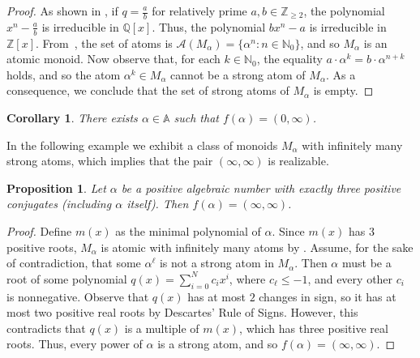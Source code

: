 \documentclass[11pt]{amsart}
\newtheorem{proposition}[theorem]{Proposition}
\newtheorem{corollary}[theorem]{Corollary}
\theoremstyle{definition}
\theoremstyle{remark}
\numberwithin{equation}{section}
\newcommand{\aaa}{\mathbb{A}}
\newcommand{\nn}{\mathbb{N}}
\newcommand{\qq}{\mathbb{Q}}
\newcommand{\zz}{\mathbb{Z}}
\begin{document}
\begin{proof}
    As shown in \cite[page 297]{sL02}, if $q=\frac{a}{b}$ for relatively prime $a,b\in \mathbb{Z}_{\ge2}$, the polynomial $x^n-\frac{a}{b}$ is irreducible in $\qq[x]$. Thus, the polynomial $bx^n-a$ is irreducible in $\zz[x]$. From~\cite[Proposition~3.9]{ABLST23}, the set of atoms is $\mathcal{A}(M_\alpha) = \{\alpha^n : n \in \nn_0\}$, and so $M_\alpha$ is an atomic monoid. Now observe that, for each $k \in \nn_0$, the equality $a \cdot \alpha^k = b \cdot \alpha^{n+k}$ holds, and so the atom $\alpha^k \in M_\alpha$ cannot be a strong atom of $M_\alpha$. As a consequence, we conclude that the set of strong atoms of $M_\alpha$ is empty.
\end{proof}

\begin{corollary}
    There exists $\alpha \in \aaa$ such that $f(\alpha) = (0,\infty)$.
\end{corollary}

In the following example we exhibit a class of monoids $M_\alpha$ with infinitely many strong atoms, which implies that the pair $(\infty, \infty)$ is realizable.

\begin{proposition}
     Let $\alpha$ be a positive algebraic number with exactly three positive conjugates (including $\alpha$ itself). Then $f(\alpha) = (\infty, \infty)$.
\end{proposition}

\begin{proof}
    Define $m(x)$ as the minimal polynomial of $\alpha$. Since $m(x)$ has $3$ positive roots, $M_\alpha$ is atomic with infinitely many atoms by . Assume, for the sake of contradiction, that some $\alpha^\ell$ is not a strong atom in $M_\alpha$. Then $\alpha$ must be a root of some polynomial $q(x) = \sum_{i=0}^N c_i x^i$, where $c_\ell \le -1$, and every other $c_i$ is nonnegative. Observe that $q(x)$ has at most $2$ changes in sign, so it has at most two positive real roots by Descartes' Rule of Signs. However, this contradicts that $q(x)$ is a multiple of $m(x)$, which has three positive real roots. Thus, every power of $\alpha$ is a strong atom, and so $f(\alpha) = (\infty, \infty)$.
\end{proof}

\end{document}
